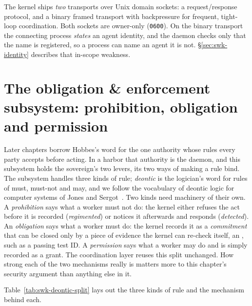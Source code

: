\documentclass[11pt,a4paper]{article}
\theoremstyle{definition}
\theoremstyle{remark}
\begin{document}
%
The kernel ships \emph{two} transports over Unix domain sockets: a
request/response protocol, and a binary framed transport with backpressure for
frequent, tight-loop coordination. Both sockets are owner-only (\texttt{0600}).
On the binary transport the connecting process \emph{states} an agent identity,
and the daemon checks only that the name is registered, so a process can name
an agent it is not. \S\ref{sec:swk-identity} describes that in-scope weakness.

\pdexercisepointer{\ref{ex:swk-decay-honest}}{\ref{ex:swk-op8-decay}}{\pageref{ex:swk-decay-honest}}

\section{The obligation \& enforcement subsystem: prohibition, obligation and permission}
\label{sec:enforcement}

Later chapters borrow Hobbes's word  for the one authority
whose rules every party accepts before acting. In a harbor that authority is
the daemon, and this subsystem holds the sovereign's two levers, its two ways
of making a rule bind.
The subsystem handles three kinds of rule; \emph{deontic} is the logician's
word for rules of must, must-not and may, and we follow the vocabulary of
deontic logic for computer systems of Jones and
Sergot~. Two kinds need machinery of their own. A
\emph{prohibition} says what a worker must not do: the kernel either refuses
the act before it is recorded (\emph{regimented}) or notices it afterwards and
responds (\emph{detected}). An \emph{obligation} says what a worker must do:
the kernel records it as a \emph{commitment} that can be closed only by a piece
of evidence the kernel can re-check itself, an , such as a
passing test ID. A \emph{permission} says what a worker may do and is simply
recorded as a grant. The coordination layer reuses this split unchanged. How
strong each of the two mechanisms really is matters more to this chapter's
security argument than anything else in it.

Table~\ref{tab:swk-deontic-split} lays out the three kinds of rule and the
mechanism behind each.
\end{document}
